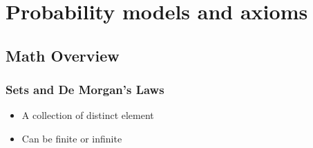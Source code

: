 
\chapter{Probability models and axioms} %

\label{Unit 1} %

\newcommand{\keyword}[1]{\textbf{#1}}
\newcommand{\tabhead}[1]{\textbf{#1}}
\newcommand{\code}[1]{\texttt{#1}}
\newcommand{\file}[1]{\texttt{\bfseries#1}}
\newcommand{\option}[1]{\texttt{\itshape#1}}

\section{Math Overview}

\subsection{Sets and De Morgan's Laws} 
\noindent{\textbf{\textcolor{brown}{Sets}}}
\begin{itemize}
\item A collection of distinct element
\item Can be finite or infinite
\end{itemize}

